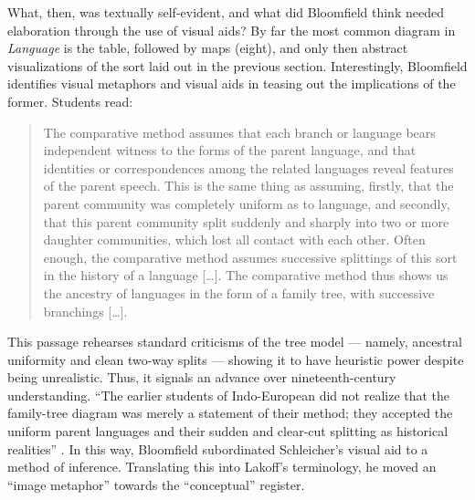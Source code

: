 \documentclass[output=paper]{langscibook}
\begin{document}
What, then, was textually self-evident, and what did Bloomfield think needed elaboration through the use of visual aids? By far the most common diagram in \emph{Language} is the table, followed by maps (eight), and only then abstract visualizations of the sort laid out in the previous section. Interestingly, Bloomfield identifies visual metaphors and visual aids in teasing out the implications of the former. Students read:

\begin{quotation}
The comparative method assumes that each branch or language bears independent witness to the forms of the parent language, and that identities or correspondences among the related languages reveal features of the parent speech. This is the same thing as assuming, firstly, that the parent community was completely uniform as to language, and secondly, that this parent community split suddenly and sharply into two or more daughter communities, which lost all contact with each other. Often enough, the comparative method assumes successive splittings of this sort in the history of a language […]. The comparative method thus shows us the ancestry of languages in the form of a family tree, with successive branchings […]. \citep[311]{Bloomfield1933}
\end{quotation}

This passage rehearses standard criticisms of the tree model — namely, ancestral uniformity and clean two-way splits — showing it to have heuristic power despite being unrealistic. Thus, it signals an advance over nineteenth-century understanding. ``The earlier students of Indo-European did not realize that the family-tree diagram was merely a statement of their method; they accepted the uniform parent languages and their sudden and clear-cut splitting as historical realities'' \citep[311]{Bloomfield1933}. In this way, Bloomfield subordinated Schleicher's visual aid to a method of inference. Translating this into Lakoff's terminology, he moved an ``image metaphor'' towards the ``conceptual'' register.
\end{document}
